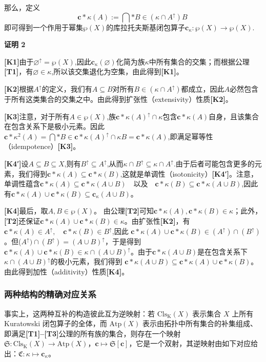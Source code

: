 那么，定义
$$
\mathbf{c}*{\kappa}(A) := \bigcap*{B \in (\kappa \cap A^{\uparrow})} B~
$$
即可得到一个作用于幂集$\wp(X)$的库拉托夫斯基闭包算子$\mathbf{c}_{\kappa} : \wp(X) \to \wp(X)$.

\textbf{证明 2}

\textbf{[K1]}由于$\varnothing^{\uparrow} = \wp(X)$,因此$\mathbf{c}_{\kappa}(\varnothing)$化简为族$\kappa$中所有集合的交集；而根据公理\textbf{[T1]}，有$\varnothing \in \kappa$,所以该交集退化为空集，由此得到\textbf{[K1]}。

\textbf{[K2]}根据$A^{\uparrow}$的定义，我们有$A \subseteq B$对所有$B \in (\kappa \cap A^{\uparrow})$都成立，因此$A$必然包含于所有这类集合的交集之中。由此得到扩张性（extensivity）性质\textbf{[K2]}。

\textbf{[K3]}注意，对于所有$A \in \wp(X)$,族$\mathbf{c}*{\kappa}(A)^{\uparrow} \cap \kappa$包含$\mathbf{c}*{\kappa}(A)$自身，且该集合在包含关系下是极小元素。因此$\mathbf{c}*{\kappa}^{2}(A)= \bigcap*{B \in \mathbf{c}*{\kappa}(A)^{\uparrow} \cap \kappa} B= \mathbf{c}*{\kappa}(A)$,即满足幂等性（idempotence）\textbf{[K3]}。

\textbf{[K4′]}设$A \subseteq B \subseteq X$,则有$B^{\uparrow} \subseteq A^{\uparrow}$,从而$\kappa \cap B^{\uparrow} \subseteq \kappa \cap A^{\uparrow}$.由于后者可能包含更多的元素，我们得到$\mathbf{c}*{\kappa}(A) \subseteq \mathbf{c}*{\kappa}(B)$,这就是单调性（isotonicity）\textbf{[K4′]}。注意，单调性蕴含$\mathbf{c}*{\kappa}(A) \subseteq \mathbf{c}*{\kappa}(A \cup B)\quad\text{以及}\quad\mathbf{c}*{\kappa}(B) \subseteq \mathbf{c}*{\kappa}(A \cup B)$,因此有$\mathbf{c}*{\kappa}(A) \cup \mathbf{c}*{\kappa}(B) \subseteq \mathbf{c}_{\kappa}(A \cup B)$。

\textbf{[K4]}最后，取$A, B \in \wp(X)$。
由公理\textbf{[T2]}可知$\mathbf{c}*{\kappa}(A), \mathbf{c}*{\kappa}(B) \in \kappa$；此外，\textbf{[T2]}还保证$\mathbf{c}*{\kappa}(A) \cup \mathbf{c}*{\kappa}(B) \in \kappa$。由扩张性\textbf{[K2]}，有$\mathbf{c}*{\kappa}(A) \in A^{\uparrow}, \quad\mathbf{c}*{\kappa}(B) \in B^{\uparrow}$,因此
$\mathbf{c}*{\kappa}(A) \cup \mathbf{c}*{\kappa}(B) \in (A^{\uparrow}) \cap (B^{\uparrow})$。但($A^{\uparrow}) \cap (B^{\uparrow}) = (A \cup B)^{\uparrow}$，于是得到$\mathbf{c}*{\kappa}(A) \cup \mathbf{c}*{\kappa}(B) \in \kappa \cap (A \cup B)^{\uparrow}$。由于$\mathbf{c}*{\kappa}(A \cup B)$是在包含关系下$\kappa \cap (A \cup B)^{\uparrow}$的极小元素，我们得到
$\mathbf{c}*{\kappa}(A \cup B) \subseteq \mathbf{c}*{\kappa}(A) \cup \mathbf{c}*{\kappa}(B)$。由此得到加性（additivity）性质\textbf{[K4]}。
\subsubsection{两种结构的精确对应关系}
事实上，这两种互补的构造彼此互为逆映射：若 $\mathrm{Cls}_{\text{K}}(X)$ 表示集合 \(X\) 上所有 Kuratowski 闭包算子的全体，而 $\mathrm{Atp}(X)$ 表示由拓扑中所有集合的补集组成、即满足\textbf{[T1]–[T3]}公理的所有族的集合，则存在一个映射 $\mathfrak{S} : \mathrm{Cls}_{\text{K}}(X) \to \mathrm{Atp}(X)$，$\mathbf{c} \mapsto \mathfrak{S}[\mathbf{c}]$，它是一个双射，其逆映射由如下对应给出：$\mathfrak{C} : \kappa \mapsto \mathbf{c}_{\kappa}$。

